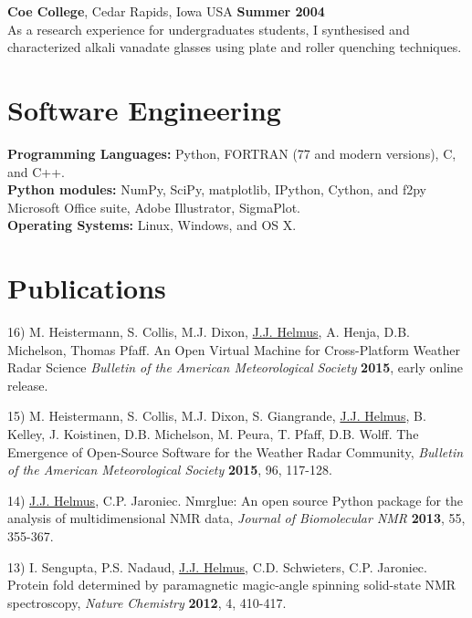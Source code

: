 \documentclass[margin,line]{res}
\begin{document}
\begin{resume}

{\bf Coe College}, Cedar Rapids, Iowa USA \hfill {\bf Summer 2004}\\
As a research experience for undergraduates students, 
I synthesised and characterized alkali vanadate glasses using plate and
roller quenching techniques. 

\section{\sc Software Engineering}
{\bf Programming Languages:} Python, FORTRAN (77 and modern versions), C, and C++.\\
{\bf Python modules:} NumPy, SciPy, matplotlib, IPython, Cython, and f2py\\
Microsoft Office suite, Adobe Illustrator, SigmaPlot.\\ 
{\bf Operating Systems:}  Linux, Windows, and OS X.\\ 

\section{\sc Publications}

16) M. Heistermann, S. Collis, M.J. Dixon, 
\underline{J.J. Helmus}, A. Henja, D.B. Michelson, Thomas Pfaff.
An Open Virtual Machine for Cross-Platform Weather Radar Science
{\em Bulletin of the American Meteorological Society} {\bf 2015}, 
early online release.

15) M. Heistermann, S. Collis, M.J. Dixon, S. Giangrande, 
\underline{J.J.  Helmus}, B. Kelley, J. Koistinen, D.B. Michelson, M. Peura, 
T. Pfaff, D.B. Wolff.
The Emergence of Open-Source Software for the Weather Radar Community,
{\em Bulletin of the American Meteorological Society} {\bf 2015}, 96, 117-128.

14) \underline{J.J. Helmus}, C.P. Jaroniec.  
Nmrglue: An open source Python package for the analysis of multidimensional NMR data,
{\em Journal of Biomolecular NMR} {\bf 2013}, 55, 355-367.

13) I. Sengupta, P.S. Nadaud, \underline{J.J. Helmus}, C.D. Schwieters, C.P. Jaroniec. 
Protein fold determined by paramagnetic magic-angle spinning solid-state NMR spectroscopy,
{\em Nature Chemistry} {\bf 2012}, 4, 410-417.


\end{resume}
\end{document}
